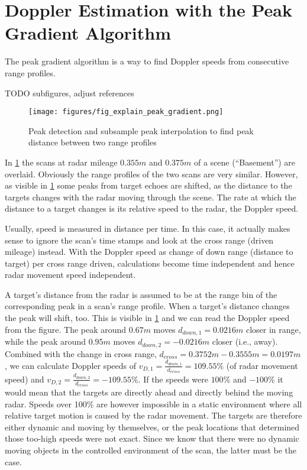 \section{Doppler Estimation with the Peak Gradient Algorithm}\label{doppler-estimation-with-the-peak-gradient-algorithm}

The peak gradient algorithm is a way to find Doppler speeds from
consecutive range profiles.

TODO subfigures, adjust references

\begin{figure}[htbp]
    \centering
    \texttt{[image: figures/fig\_explain\_peak\_gradient.png]}
    \caption{Peak detection and subsample peak interpolation to find peak distance between two range profiles}
    \label{fig:fig_explain_peak_gradient}
\end{figure}

In \cref{fig:fig_explain_peak_gradient} the scans at radar mileage \(0.355m\) and \(0.375m\) of
a scene (``Basement'') are overlaid. Obviously the range profiles of the
two scans are very similar. However, as visible in \cref{fig:fig_explain_peak_gradient} some
peaks from target echoes are shifted, as the distance to the targets
changes with the radar moving through the scene. The rate at which the
distance to a target changes is its relative speed to the radar, the
Doppler speed.

Usually, speed is measured in distance per time. In this case, it
actually makes sense to ignore the scan's time stamps and look at the
cross range (driven mileage) instead. With the Doppler speed as change
of down range (distance to target) per cross range driven, calculations
become time independent and hence radar movement speed independent.

A target's distance from the radar is assumed to be at the range bin of
the corresponding peak in a scan's range profile. When a target's
distance changes the peak will shift, too. This is visible in \cref{fig:fig_explain_peak_gradient} and we can read the Doppler speed from the figure. The peak around
\(0.67m\) moves \(d_{down,1} = 0.0216m\) closer in range, while the peak
around \(0.95m\) moves \(d_{down,2} = -0.0216m\) closer (i.e., away).
Combined with the change in cross range,
\(d_{cross} = 0.3752m - 0.3555m = 0.0197m\), we can calculate Doppler
speeds of \(v_{D,1} = \frac{d_{down,1}}{d_{cross}} = 109.55 \%\) (of
radar movement speed) and
\(v_{D,2} = \frac{d_{down,2}}{d_{cross}} = -109.55 \%\). If the speeds
were \(100\%\) and \(-100\%\) it would mean that the targets are directly
ahead and directly behind the moving radar. Speeds over 100\% are
however impossible in a static environment where all relative target
motion is caused by the radar movement. The targets are therefore either
dynamic and moving by themselves, or the peak locations that determined
those too-high speeds were not exact. Since we know that there were no
dynamic moving objects in the controlled environment of the scan, the
latter must be the case.

